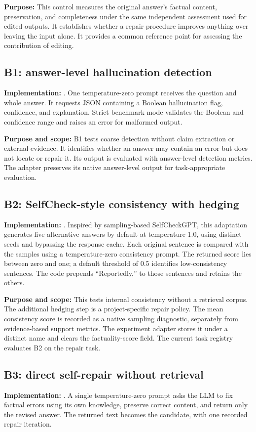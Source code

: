 \documentclass[11pt,a4paper]{article}
\newcommand{\code}[1]{\texttt{\detokenize{#1}}}
\begin{document}
\textbf{Purpose:} This control measures the original answer's factual content, preservation, and completeness under the same independent assessment used for edited outputs. It establishes whether a repair procedure improves anything over leaving the input alone. It provides a common reference point for assessing the contribution of editing.

\subsection{B1: answer-level hallucination detection}
\textbf{Implementation:} \code{b1_answer_level.py}. One temperature-zero prompt receives the question and whole answer. It requests JSON containing a Boolean hallucination flag, confidence, and explanation. Strict benchmark mode validates the Boolean and confidence range and raises an error for malformed output.

\textbf{Purpose and scope:} B1 tests coarse detection without claim extraction or external evidence. It identifies whether an answer may contain an error but does not locate or repair it. Its output is evaluated with answer-level detection metrics. The adapter preserves its native answer-level output for task-appropriate evaluation.

\subsection{B2: SelfCheck-style consistency with hedging}
\textbf{Implementation:} \code{b2_selfcheck.py}. Inspired by sampling-based SelfCheckGPT, this adaptation generates five alternative answers by default at temperature 1.0, using distinct seeds and bypassing the response cache. Each original sentence is compared with the samples using a temperature-zero consistency prompt. The returned score lies between zero and one; a default threshold of 0.5 identifies low-consistency sentences. The code prepends ``Reportedly,'' to those sentences and retains the others.

\textbf{Purpose and scope:} This tests internal consistency without a retrieval corpus. The additional hedging step is a project-specific repair policy. The mean consistency score is recorded as a native sampling diagnostic, separately from evidence-based support metrics. The experiment adapter stores it under a distinct name and clears the factuality-score field. The current task registry evaluates B2 on the repair task.

\subsection{B3: direct self-repair without retrieval}
\textbf{Implementation:} \code{b3_self_repair.py}. A single temperature-zero prompt asks the LLM to fix factual errors using its own knowledge, preserve correct content, and return only the revised answer. The returned text becomes the candidate, with one recorded repair iteration.
\end{document}
